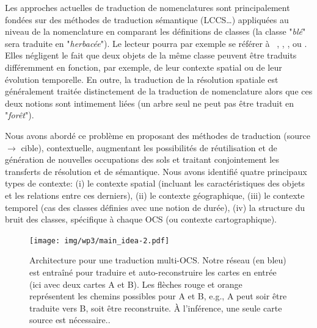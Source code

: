 Les approches actuelles de traduction de nomenclatures sont principalement fondées sur des méthodes de traduction sémantique (LCCS\ldots) appliquées au niveau de la nomenclature en comparant les définitions de classes (la classe "\textit{blé}" sera traduite en "\textit{herbacée}"). Le lecteur pourra par exemple se référer à ~\cite{DiGregorio1998}, \cite{Jepsen2013}, \cite{Adamo2014}, ou \cite{Li2020}. Elles négligent le fait que deux objets de la même classe peuvent être traduits différemment en fonction, par exemple, de leur contexte spatial ou de leur évolution temporelle. En outre, la traduction de la résolution spatiale est généralement traitée distinctement de la traduction de nomenclature alors que ces deux notions sont intimement liées (un arbre seul ne peut pas être traduit en "\textit{forêt}").
       
Nous avons abordé ce problème en proposant des méthodes de traduction (source $\rightarrow$ cible), contextuelle, augmentant les possibilités de réutilisation et de génération de nouvelles occupations des sols et traitant conjointement les transferts de résolution et de sémantique. Nous avons identifié quatre principaux types de contexte: (i) le contexte spatial (incluant les caractéristiques des objets et les relations entre ces derniers), (ii) le contexte géographique, (iii) le contexte temporel (cas des classes définies avec une notion de durée), (iv) la structure du bruit des classes, spécifique à chaque OCS (ou contexte cartographique).\\
     \begin{figure}[htbp]
        \centering%
        \texttt{[image: img/wp3/main\_idea-2.pdf]}
       \caption{Architecture pour une traduction multi-OCS. Notre réseau (en bleu) est entraîné pour traduire et auto-reconstruire les cartes en entrée (ici avec deux cartes A et B). Les flèches rouge et orange représentent les chemins possibles pour A et B, e.g., A peut soir être traduite vers B, soit être reconstruite. \`A l'inférence, une seule carte source est nécessaire.\label{fig:mlctnet}.}
        \end{figure}
